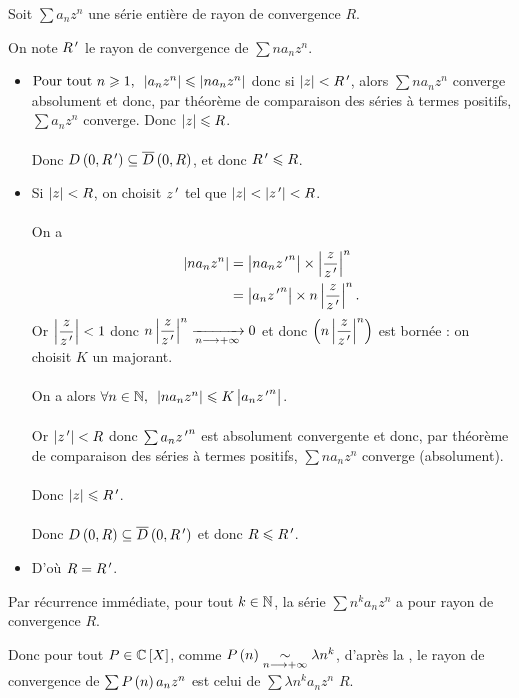 \begin{dem}
Soit \(\sum a_nz^n\) une série entière de rayon de convergence \(R\).

On note \(R^{\,\prime}\) le rayon de convergence de \(\sum na_nz^n\).

\begin{itemize}
    \item \(\quantifs{\Tpt n\geq1}\abs{a_nz^n}\leq\abs{na_nz^n}\) donc si \(\left\lvert z\right\rvert<R^{\,\prime}\), alors \(\sum na_nz^n\) converge absolument et donc, par théorème de comparaison des séries à termes positifs, \(\sum a_nz^n\) converge. Donc \(\left\lvert z\right\rvert\leqslant R\). \\\\ Donc \(\disqueo{0}{R\prim}\subset\disquef{0}{R}\), et donc \(R^{\,\prime}\leqslant R\). \\
    \item Si \(\left\lvert z\right\rvert<R\), on choisit \(z^{\,\prime}\) tel que \(\left\lvert z\right\rvert<\left\lvert z^{\,\prime}\right\rvert<R\). \\\\ On a \[\begin{aligned}
        \left\lvert na_nz^n\right\rvert&=\left\lvert na_n{z^{\,\prime}}^n\right\rvert\times\left\lvert\dfrac{z}{z^{\,\prime}}\right\rvert^n \\
        &=\left\lvert a_n{z^{\,\prime}}^n\right\rvert\times n\left\lvert\dfrac{z}{z^{\,\prime}}\right\rvert^n.
    \end{aligned}\] Or \(\left\lvert\dfrac{z}{z^{\,\prime}}\right\rvert<1\) donc \(n\left\lvert\dfrac{z}{z^{\,\prime}}\right\rvert^n\xrightarrow[n\longrightarrow+\infty]{}0\) et donc \(\left(n\left\lvert\dfrac{z}{z^{\,\prime}}\right\rvert^n\right)\) est bornée : on choisit \(K\) un majorant. \\\\ On a alors \(\quantifs{\forall n\in\N}\abs{na_nz^n}\leq K\abs{a_n{z\prim}^n}\). \\\\ Or \(\left\lvert z^{\,\prime}\right\rvert<R\) donc \(\sum a_n{z^{\,\prime}}^n\) est absolument convergente et donc, par théorème de comparaison des séries à termes positifs, \(\sum na_nz^n\) converge (absolument). \\\\ Donc \(\left\lvert z\right\rvert\leqslant R^{\,\prime}\). \\\\ Donc \(\disqueo{0}{R}\subset\disquef{0}{R\prim}\) et donc \(R\leqslant R^{\,\prime}\). \\
    \item D'où \(R=R^{\,\prime}\).
\end{itemize}

Par récurrence immédiate, pour tout \(k\in\mathbb{N}\), la série \(\sum n^ka_nz^n\) a pour rayon de convergence \(R\).

Donc pour tout \(P\in\poly[\C]\), comme \(P\left(n\right)\underset{n\longrightarrow+\infty}{\sim}\lambda n^k\), d'après la , le rayon de convergence de \(\sum P\left(n\right)a_nz^n\) est celui de \(\sum\lambda n^ka_nz^n\) \ie \(R\).
\end{dem}

